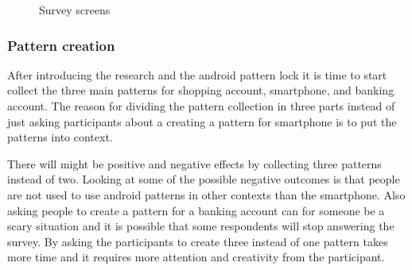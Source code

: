 \begin{figure}[H]
{          \label{fig:ALPintroduction}
        }
        \caption{Survey screens}
        \label{fig:introductionviews}
      \end{figure}

    \subsubsection{Pattern creation}
      After introducing the research and the android pattern lock it is time to start collect the three main patterns for shopping account, smartphone, and banking account.
      The reason for dividing the pattern collection in three parts instead of just asking participants about a creating a pattern for smartphone is to put the patterns into context. 

      There will might be positive and negative effects by collecting three patterns instead of two. Looking at some of the possible negative outcomes is that people are not used to use android patterns in other contexts than the smartphone. Also asking people to create a pattern for a banking account can for someone be a scary situation and it is possible that some respondents will stop answering the survey. By asking the participants to create three instead of one pattern takes more time and it requires more attention and creativity from the participant. 

